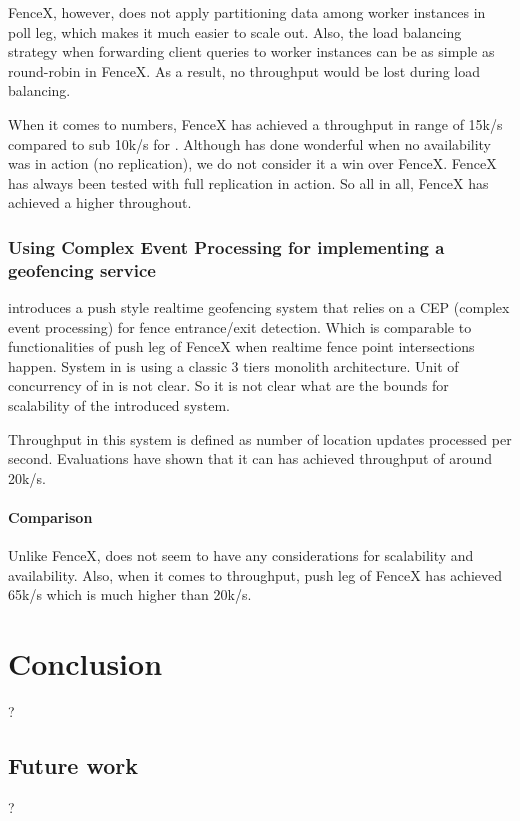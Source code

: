 \documentclass[a4]{report}
\begin{document}
    FenceX, however, does not apply partitioning data among worker instances in poll leg, which makes it much easier to
    scale out.
    Also, the load balancing strategy when forwarding client queries to worker instances can be as simple as
    round-robin in FenceX.
    As a result, no throughput would be lost during load balancing.

    When it comes to numbers, FenceX has achieved a throughput in range of 15k/s compared to sub 10k/s for
    \cite{Cirillo_Jacobs_Martin_Szczytowski_2014}.
    Although \cite{Cirillo_Jacobs_Martin_Szczytowski_2014} has done wonderful when no availability was in action
    (no replication), we do not consider it a win over FenceX.
    FenceX has always been tested with full replication in action.
    So all in all, FenceX has achieved a higher throughout.

    \subsection{Using Complex Event Processing for implementing a geofencing service}
    \cite{Nechifor_Comnac_2013} introduces a push style realtime geofencing system that relies on a CEP
    (complex event processing) for fence entrance/exit detection.
    Which is comparable to functionalities of push leg of FenceX when realtime fence point intersections happen.
    System in \cite{Nechifor_Comnac_2013} is using a classic 3 tiers monolith architecture.
    Unit of concurrency of in \cite{Nechifor_Comnac_2013} is not clear.
    So it is not clear what are the bounds for scalability of the introduced system.

    Throughput in this system is defined as number of location updates processed per second.
    Evaluations have shown that it can has achieved throughput of around 20k/s.

    \subsubsection{Comparison}
    Unlike FenceX, \cite{Nechifor_Comnac_2013} does not seem to have any considerations for
    scalability and availability.
    Also, when it comes to throughput, push leg of FenceX has achieved 65k/s which is much higher than 20k/s.

    \chapter{Conclusion}
    ?
    \section{Future work}
    ?
\end{document}
